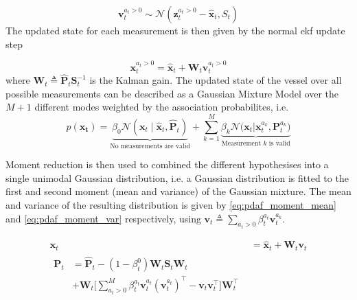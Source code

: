 \begin{equation}
    \boldsymbol{v}_t^{a_t>0} \sim \mathcal{N}(\boldsymbol{z}_t^{a_t>0} - \hat{\boldsymbol{x}}_t, S_t)
\end{equation}
The updated state for each measurement is then given by the normal \acrshort{ekf} update step

\begin{equation}
    \boldsymbol{x}_t^{a_t > 0} = \hat{\boldsymbol{x}}_t + \boldsymbol{W}_t \boldsymbol{v}_t^{a_t > 0}
\end{equation} where $\boldsymbol{W}_t \triangleq \hat{\boldsymbol{P}}_t \boldsymbol{S}_t^{-1}$ is the Kalman gain.
The updated state of the vessel over all possible measurements can be described as a Gaussian Mixture Model over the $M+1$ different modes weighted by the association probabilites, i.e.
\begin{equation}
    p(\boldsymbol{x_t}) = \underbrace{\beta_0 \mathcal{N}(\boldsymbol{x}_t \; | \; \hat{\boldsymbol{x}}_t, \hat{\boldsymbol{P}}_t)}_{\text{No measurements are valid}} + \sum_{k=1}^M \underbrace{\beta_k \mathcal{N}\big(\boldsymbol{x}_t | \boldsymbol{x}_t^{a_k}, \boldsymbol{P}_t^{a_k}\big)}_{\text{Measurement $k$ is valid}}
\end{equation}


Moment reduction is then used to combined the different hypothesises into a single unimodal Gaussian distribution, i.e. a Gaussian distribution is fitted to the first and second moment (mean and variance) of the Gaussian mixture. The mean and variance of the resulting distribution is given by \cref{eq:pdaf_moment_mean} and \cref{eq:pdaf_moment_var} respectively, using $\boldsymbol{v}_t \triangleq \sum_{a_t > 0} \beta_t^{a_t} \boldsymbol{v}_t^{a_k}$.

\begin{subequations}
    \begin{align}
        \boldsymbol{x}_t & = \hat{\boldsymbol{x}}_t + \boldsymbol{W}_t \boldsymbol{v}_t \label{eq:pdaf_moment_mean} \\
        \begin{split}
            \boldsymbol{P}_t &= \hat{\boldsymbol{P}}_t - (1 - \beta_t^{0}) \boldsymbol{W}_t \boldsymbol{S}_t  \boldsymbol{W}_t\\ &+ \boldsymbol{W}_t \big[\sum_{a_t > 0}^M \beta_t^{a_t} \boldsymbol{v}_t^{a_t} (\boldsymbol{v}_t^{a_t})^\intercal - \boldsymbol{v}_t \boldsymbol{v}_t^\intercal \big] \boldsymbol{W}_t^\intercal\label{eq:pdaf_moment_var}
        \end{split}
    \end{align}
\end{subequations}

